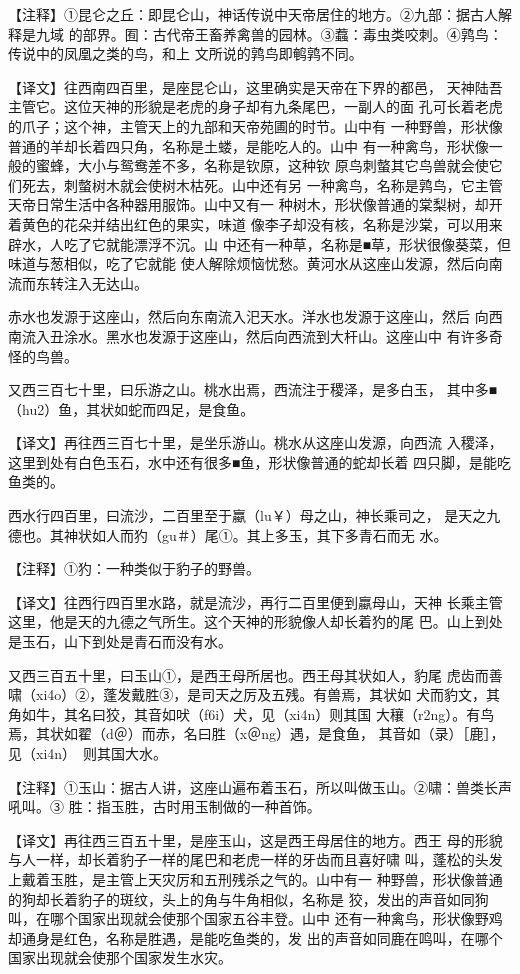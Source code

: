 \documentclass[a4paper,12pt,UTF8,twoside]{ctexbook}
\begin{document}
【注释】①昆仑之丘：即昆仑山，神话传说中天帝居住的地方。②九部：据古人解释是九域 的部界。囿：古代帝王畜养禽兽的园林。③蠚：毒虫类咬刺。④鹑鸟：传说中的凤凰之类的鸟，和上 文所说的鹑鸟即鹌鹑不同。

【译文】往西南四百里，是座昆仑山，这里确实是天帝在下界的都邑， 天神陆吾主管它。这位天神的形貌是老虎的身子却有九条尾巴，一副人的面 孔可长着老虎的爪子；这个神，主管天上的九部和天帝苑圃的时节。山中有 一种野兽，形状像普通的羊却长着四只角，名称是土蝼，是能吃人的。山中 有一种禽鸟，形状像一般的蜜蜂，大小与鸳鸯差不多，名称是钦原，这种钦 原鸟刺螫其它鸟兽就会使它们死去，刺螫树木就会使树木枯死。山中还有另 一种禽鸟，名称是鹑鸟，它主管天帝日常生活中各种器用服饰。山中又有一 种树木，形状像普通的棠梨树，却开着黄色的花朵并结出红色的果实，味道 像李子却没有核，名称是沙棠，可以用来辟水，人吃了它就能漂浮不沉。山 中还有一种草，名称是■草，形状很像葵菜，但味道与葱相似，吃了它就能 使人解除烦恼忧愁。黄河水从这座山发源，然后向南流而东转注入无达山。

赤水也发源于这座山，然后向东南流入汜天水。洋水也发源于这座山，然后 向西南流入丑涂水。黑水也发源于这座山，然后向西流到大杆山。这座山中 有许多奇怪的鸟兽。

又西三百七十里，曰乐游之山。桃水出焉，西流注于稷泽，是多白玉， 其中多■（hu2）鱼，其状如蛇而四足，是食鱼。

【译文】再往西三百七十里，是坐乐游山。桃水从这座山发源，向西流 入稷泽，这里到处有白色玉石，水中还有很多■鱼，形状像普通的蛇却长着 四只脚，是能吃鱼类的。

西水行四百里，曰流沙，二百里至于蠃（lu￥）母之山，神长乘司之， 是天之九德也。其神状如人而犳（gu＃）尾①。其上多玉，其下多青石而无 水。

【注释】①犳：一种类似于豹子的野兽。

【译文】往西行四百里水路，就是流沙，再行二百里便到蠃母山，天神 长乘主管这里，他是天的九德之气所生。这个天神的形貌像人却长着犳的尾 巴。山上到处是玉石，山下到处是青石而没有水。

又西三百五十里，曰玉山①，是西王母所居也。西王母其状如人，豹尾 虎齿而善啸（xi4o）②，蓬发戴胜③，是司天之厉及五残。有兽焉，其状如 犬而豹文，其角如牛，其名曰狡，其音如吠（f6i）犬，见（xi4n）则其国 大穰（r2ng）。有鸟焉，其状如翟（d＠）而赤，名曰胜（x＠ng）遇，是食鱼， 其音如（录）［鹿］，见（xi4n）　则其国大水。

【注释】①玉山：据古人讲，这座山遍布着玉石，所以叫做玉山。②啸：兽类长声吼叫。③ 胜：指玉胜，古时用玉制做的一种首饰。

【译文】再往西三百五十里，是座玉山，这是西王母居住的地方。西王 母的形貌与人一样，却长着豹子一样的尾巴和老虎一样的牙齿而且喜好啸 叫，蓬松的头发上戴着玉胜，是主管上天灾厉和五刑残杀之气的。山中有一 种野兽，形状像普通的狗却长着豹子的斑纹，头上的角与牛角相似，名称是 狡，发出的声音如同狗叫，在哪个国家出现就会使那个国家五谷丰登。山中 还有一种禽鸟，形状像野鸡却通身是红色，名称是胜遇，是能吃鱼类的，发 出的声音如同鹿在鸣叫，在哪个国家出现就会使那个国家发生水灾。
\end{document}
